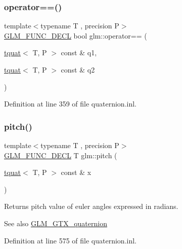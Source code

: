 \subsubsection{\texorpdfstring{operator==()}{operator==()}}
{\footnotesize\ttfamily template$<$typename T , precision P$>$ \\
\mbox{\hyperlink{setup_8hpp_ab2d052de21a70539923e9bcbf6e83a51}{G\+L\+M\+\_\+\+F\+U\+N\+C\+\_\+\+D\+E\+CL}} bool glm\+::operator== (\begin{DoxyParamCaption}\item[{\mbox{\hyperlink{structglm_1_1tquat}{tquat}}$<$ T, P $>$ const \&}]{q1,  }\item[{\mbox{\hyperlink{structglm_1_1tquat}{tquat}}$<$ T, P $>$ const \&}]{q2 }\end{DoxyParamCaption})}



Definition at line 359 of file quaternion.\+inl.

\mbox{\label{group__gtc__quaternion_ga2c08b93a4261c10748fd4d2104346f17}} 
\subsubsection{\texorpdfstring{pitch()}{pitch()}}
{\footnotesize\ttfamily template$<$typename T , precision P$>$ \\
\mbox{\hyperlink{setup_8hpp_ab2d052de21a70539923e9bcbf6e83a51}{G\+L\+M\+\_\+\+F\+U\+N\+C\+\_\+\+D\+E\+CL}} T glm\+::pitch (\begin{DoxyParamCaption}\item[{\mbox{\hyperlink{structglm_1_1tquat}{tquat}}$<$ T, P $>$ const \&}]{x }\end{DoxyParamCaption})}

Returns pitch value of euler angles expressed in radians.

\begin{DoxySeeAlso}{See also}
\mbox{\hyperlink{group__gtx__quaternion}{G\+L\+M\+\_\+\+G\+T\+X\+\_\+quaternion}} 
\end{DoxySeeAlso}


Definition at line 575 of file quaternion.\+inl.

\mbox{\label{group__gtc__quaternion_ga950f8acff3e33bbda77895a3dcb7e5ce}} 
